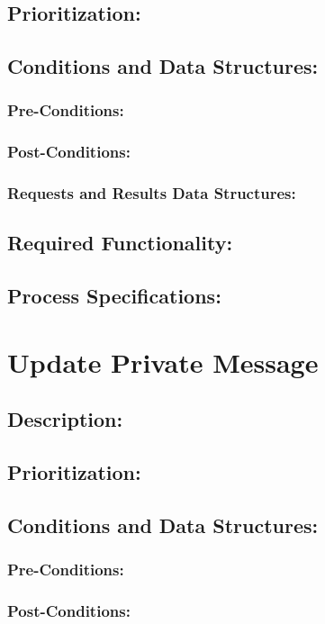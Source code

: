 \documentclass[a4paper,11pt]{article}
\begin{document}
\subsection{Prioritization:} 
\subsection{Conditions and Data Structures:}
\subsubsection*{Pre-Conditions:}
\subsubsection*{Post-Conditions:}
\subsubsection*{Requests and Results Data Structures:}
\subsection{Required Functionality:} 
\subsection{Process Specifications:} 

\section{Update Private Message}
\subsection*{Description:}
\subsection{Prioritization:} 
\subsection{Conditions and Data Structures:}
\subsubsection*{Pre-Conditions:}
\subsubsection*{Post-Conditions:}
\end{document}
